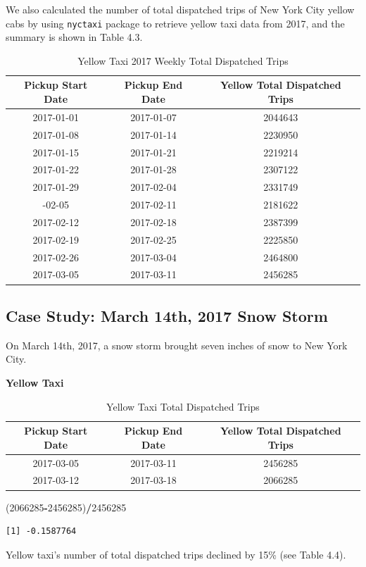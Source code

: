 \documentclass[12pt,twoside]{reedthesis}
\newenvironment{Shaded}{\begin{snugshade}}{\end{snugshade}}
\newcommand{\DecValTok}[1]{\textcolor[rgb]{0.00,0.00,0.81}{#1}}
\newcommand{\OperatorTok}[1]{\textcolor[rgb]{0.81,0.36,0.00}{\textbf{#1}}}
\newcommand{\NormalTok}[1]{#1}
\theoremstyle{definition}
\theoremstyle{definition}
\theoremstyle{definition}
\theoremstyle{remark}
\begin{document}
We also calculated the number of total dispatched trips of New York City
yellow cabs by using \texttt{nyctaxi} package to retrieve yellow taxi
data from 2017, and the summary is shown in Table 4.3.
\begin{table}

\caption{\label{tab:unnamed-chunk-68}Yellow Taxi 2017 Weekly Total Dispatched Trips}
\centering
\begin{tabular}[t]{ccc}
\toprule
Pickup Start Date & Pickup End Date & Yellow Total Dispatched Trips\\
\midrule
2017-01-01 & 2017-01-07 & 2044643\\
2017-01-08 & 2017-01-14 & 2230950\\
2017-01-15 & 2017-01-21 & 2219214\\
2017-01-22 & 2017-01-28 & 2307122\\
2017-01-29 & 2017-02-04 & 2331749\\
\addlinespace
2017-02-05 & 2017-02-11 & 2181622\\
2017-02-12 & 2017-02-18 & 2387399\\
2017-02-19 & 2017-02-25 & 2225850\\
2017-02-26 & 2017-03-04 & 2464800\\
2017-03-05 & 2017-03-11 & 2456285\\
\bottomrule
\end{tabular}
\end{table}
\subsection{Case Study: March 14th, 2017 Snow
Storm}\label{case-study-march-14th-2017-snow-storm}

On March 14th, 2017, a snow storm brought seven inches of snow to New
York City.

\textbf{Yellow Taxi}
\begin{table}

\caption{\label{tab:unnamed-chunk-70}Yellow Taxi Total Dispatched Trips}
\centering
\begin{tabular}[t]{ccc}
\toprule
Pickup Start Date & Pickup End Date & Yellow Total Dispatched Trips\\
\midrule
2017-03-05 & 2017-03-11 & 2456285\\
2017-03-12 & 2017-03-18 & 2066285\\
\bottomrule
\end{tabular}
\end{table}
\begin{Shaded}
\begin{Highlighting}[]
\NormalTok{(}\DecValTok{2066285}\OperatorTok{-}\DecValTok{2456285}\NormalTok{)}\OperatorTok{/}\DecValTok{2456285}
\end{Highlighting}
\end{Shaded}
\begin{verbatim}
[1] -0.1587764
\end{verbatim}
Yellow taxi's number of total dispatched trips declined by 15\% (see
Table 4.4).
\end{document}
